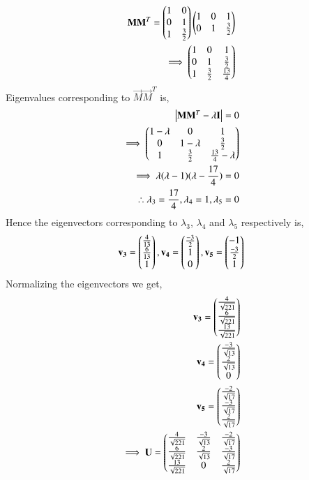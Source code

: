 \begin{align}
\mathbf{MM}^T = \begin{pmatrix}1&0\\0&1\\1&\frac{3}{2}\end{pmatrix}\begin{pmatrix}1&0&1\\0&1&\frac{3}{2}\end{pmatrix} \\\implies \begin{pmatrix}1&0&1\\0&1&\frac{3}{2}\\1&\frac{3}{2}&\frac{13}{4}\end{pmatrix}
\end{align}
Eigenvalues corresponding to $\vec{M}\vec{M}^T$  is,
\begin{align}
\begin{vmatrix}\mathbf{M}\mathbf{M}^T-\lambda\mathbf{I}\end{vmatrix} = 0\\
\implies \begin{pmatrix}1-\lambda&0&1\\0&1-\lambda&\frac{3}{2}\\1&\frac{3}{2}&\frac{13}{4}-\lambda\end{pmatrix}\\
\implies \lambda(\lambda-1)(\lambda-\frac{17}{4}) = 0\\
\therefore \lambda_3 = \frac{17}{4}, \lambda_4 = 1, \lambda_5 = 0\label{eq:solutions/4/45/3/b/eq:lambda5}
\end{align} 
Hence the eigenvectors corresponding to $\lambda_3$, $\lambda_4$ and  $\lambda_5$ respectively is,
\begin{align}
\mathbf{v_3} =\begin{pmatrix}\frac{4}{13}\\\frac{6}{13}\\1\end{pmatrix},
\mathbf{v_4} =\begin{pmatrix}\frac{-3}{2}\\1\\0\end{pmatrix},
\mathbf{v_5} = \begin{pmatrix}-1\\\frac{-3}{2}\\1\end{pmatrix}
\end{align}
Normalizing the eigenvectors we get,
\begin{align}
\mathbf{v_3} = \begin{pmatrix}\frac{4}{\sqrt{221}}\\\frac{6}{\sqrt{221}}\\\frac{13}{\sqrt{221}}\end{pmatrix}\\
\mathbf{v_4} = \begin{pmatrix}\frac{-3}{\sqrt{13}}\\\frac{2}{\sqrt{13}}\\0\end{pmatrix}\\
\mathbf{v_5} = \begin{pmatrix}\frac{-2}{\sqrt{17}}\\\frac{-3}{\sqrt{17}}\\\frac{2}{\sqrt{17}}\end{pmatrix}\\
\implies \mathbf{U} = \begin{pmatrix}\frac{4}{\sqrt{221}} &\frac{-3}{\sqrt{13}} & \frac{-2}{\sqrt{17}}\\\frac{6}{\sqrt{221}} &\frac{2}{\sqrt{13}} &\frac{-3}{\sqrt{17}} \\\frac{13}{\sqrt{221}}&0& \frac{2}{\sqrt{17}}\end{pmatrix} \label{eq:solutions/4/45/3/b/eq:U}
\end{align} 
